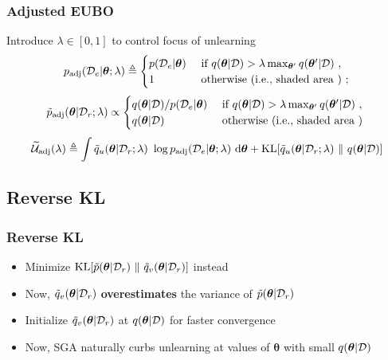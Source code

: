 \documentclass[pdf]{beamer}
\begin{document}

\begin{frame}
  \frametitle{Adjusted EUBO}
    Introduce $\lambda \in [0,1]$ to control focus of unlearning
    \[
      p_{\text{adj}}(\mathcal{D}_e|\bm{\theta}; \lambda) \triangleq 
	\begin{cases}
		p(\mathcal{D}_e|\bm{\theta}) &\text{ if } q(\bm{\theta}|\mathcal{D}) > \lambda \max_{\bm{\theta}'} q(\bm{\theta}'|\mathcal{D})\ ,\\
		1 &\text{ otherwise (i.e., shaded area )}\ ;
	\end{cases}
    \]
    \[
      \tilde{p}_{\text{adj}}(\bm{\theta}|\mathcal{D}_r; \lambda) \propto 
	\begin{cases}
		q(\bm{\theta}|\mathcal{D}) / p(\mathcal{D}_e| \bm{\theta}) &\text{ if } q(\bm{\theta}|\mathcal{D}) > \lambda \max_{\bm{\theta}'} q(\bm{\theta}'|\mathcal{D})\ ,\\
		q(\bm{\theta}|\mathcal{D}) &\text{ otherwise (i.e., shaded area )\ }
	\end{cases}
    \]
    \[
      \widetilde{\mathcal{U}}_{\text{adj}}(\lambda) \triangleq \int \tilde{q}_u(\bm{\theta}|\mathcal{D}_r; \lambda)\ \log p_{\text{adj}}(\mathcal{D}_e|\bm{\theta}; \lambda)\ \text{d}\bm{\theta} + \text{KL}[\tilde{q}_u(\bm{\theta}|\mathcal{D}_r; \lambda)\ \Vert\ q(\bm{\theta}|\mathcal{D})]
    \]
  
\end{frame}

\subsection{Reverse KL}
\begin{frame}
  \frametitle{Reverse KL}
  \begin{itemize}
    \item Minimize $\text{KL}[\tilde{p}(\bm{\theta}|\mathcal{D}_r)\ \Vert\ \tilde{q}_v(\bm{\theta}|\mathcal{D}_r)]$ instead
    \item Now, $\tilde{q}_v(\bm{\theta}|\mathcal{D}_r)$ \textbf{overestimates} the variance of $\tilde{p}(\bm{\theta}|\mathcal{D}_r)$
    \item Initialize $\tilde{q}_v(\bm{\theta}|\mathcal{D}_r)$ at $q(\bm{\theta}|\mathcal{D})$ for faster convergence
    \item Now, SGA naturally curbs unlearning at values of $\bm{\theta}$ with small $q(\bm{\theta}|\mathcal{D})$
  \end{itemize}

\end{frame}
\end{document}

